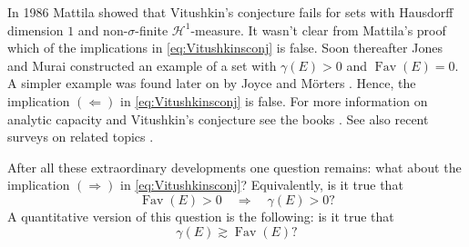 \documentclass[11pt,reqno]{amsart}
\theoremstyle{definition}
\theoremstyle{remark}
\numberwithin{equation}{section}
\newcommand{\dH}{\mathcal{H}}
\DeclareMathOperator{\Fav}{Fav}
\theoremstyle{theorem}
\theoremstyle{definition}
\theoremstyle{remark}
\numberwithin{equation}{section}
\begin{document}
	In 1986 Mattila \cite{mattila1986smooth} showed that Vitushkin's conjecture fails for sets with Hausdorff dimension $1$ and non-$\sigma$-finite $\dH^1$-measure. It wasn't clear from Mattila's proof which of the implications in \eqref{eq:Vitushkinsconj} is false. Soon thereafter Jones and Murai \cite{jones1988positive} constructed an example of a set with $\gamma(E)>0$ and $\Fav(E)=0$. A simpler example was found later on by Joyce and M\"{o}rters \cite{joyce2000set}. Hence, the implication $(\Leftarrow)$ in \eqref{eq:Vitushkinsconj} is false. For more information on analytic capacity and Vitushkin's conjecture see the books \cite{tolsa2014analytic,dudziak2011vitushkin,pajot2002analytic}. See also recent surveys on related topics \cite{verdera2021birth,mattila2021rectifiability}.
	
	After all these extraordinary developments one question remains: what about the implication $(\Rightarrow)$ in \eqref{eq:Vitushkinsconj}? Equivalently, is it true that 
	\begin{equation}\label{eq:Vitushkin2}
		\Fav(E)>0\quad\Rightarrow\quad\gamma(E)>0?
	\end{equation}
	A quantitative version of this question is the following: is it true that
	\begin{equation}\label{Vituskin3}
		\gamma(E)\gtrsim \Fav(E)?
	\end{equation}
	
\end{document}
